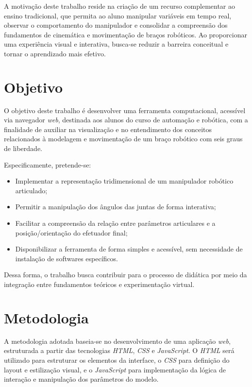 A motivação deste trabalho reside na criação de um recurso complementar ao ensino tradicional, que permita ao aluno manipular variáveis em tempo real, observar o comportamento do manipulador e consolidar a compreensão dos fundamentos de cinemática e movimentação de braços robóticos. Ao proporcionar uma experiência visual e interativa, busca-se reduzir a barreira conceitual e tornar o aprendizado mais efetivo.

\section{Objetivo}

O objetivo deste trabalho é desenvolver uma ferramenta computacional, acessível via navegador \textit{web}, destinada aos alunos do curso de automação e robótica, com a finalidade de auxiliar na visualização e no entendimento dos conceitos relacionados à modelagem e movimentação de um braço robótico com seis graus de liberdade.

Especificamente, pretende-se:

\begin{itemize}
    \item Implementar a representação tridimensional de um manipulador robótico articulado;
    \item Permitir a manipulação dos ângulos das juntas de forma interativa;
    \item Facilitar a compreensão da relação entre parâmetros articulares e a posição/orientação do efetuador final;
    \item Disponibilizar a ferramenta de forma simples e acessível, sem necessidade de instalação de softwares específicos.
\end{itemize}

Dessa forma, o trabalho busca contribuir para o processo de didática por meio da integração entre fundamentos teóricos e experimentação virtual.

\section{Metodologia}

A metodologia adotada baseia-se no desenvolvimento de uma aplicação \textit{web}, estruturada a partir das tecnologias \textit{HTML}, \textit{CSS} e \textit{JavaScript}. O \textit{HTML} será utilizado para estruturar os elementos da interface, o \textit{CSS} para definição do layout e estilização visual, e o \textit{JavaScript} para implementação da lógica de interação e manipulação dos parâmetros do modelo.

